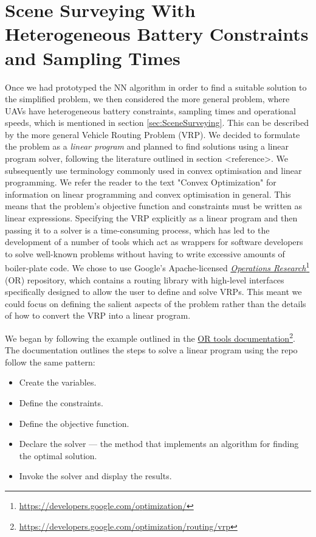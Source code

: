 \section{Scene Surveying With Heterogeneous Battery Constraints and Sampling Times}

Once we had prototyped the NN algorithm in order to find a suitable solution to the simplified problem, we then considered the more general problem, where UAVs have heterogeneous battery constraints, sampling times and operational speeds, which is mentioned in section \ref{sec:SceneSurveying}. This can be described by the more general Vehicle Routing Problem (VRP). We decided to formulate the problem as a \textit{linear program} and planned to find solutions using a linear program solver, following the literature outlined in section <reference>. We subsequently use terminology commonly used in convex optimisation and linear programming. We refer the reader to the text "Convex Optimization" \cite{Boyd2004ConvexOptimization} for information on linear programming and convex optimisation in general. This means that the problem's objective function and constraints must be written as linear expressions.
Specifying the VRP explicitly as a linear program and then passing it to a solver is a time-consuming process, which has led to the development of a number of tools which act as wrappers for software developers to solve well-known problems without having to write excessive amounts of boiler-plate code. We chose to use Google's Apache-licensed \href{https://developers.google.com/optimization/}{\textit{Operations Research}}\footnote{\href {https://developers.google.com/optimization/}{https://developers.google.com/optimization/}} (OR) repository, which contains a routing library with high-level interfaces specifically designed to allow the user to define and solve VRPs. This meant we could focus on defining the salient aspects of the problem rather than the details of how to convert the VRP into a linear program.

We began by following the example outlined in the \href{https://developers.google.com/optimization/routing/vrp}{OR tools documentation}\footnote{\href {https://developers.google.com/optimization/routing/vrp}{https://developers.google.com/optimization/routing/vrp}}. The documentation outlines the steps to solve a linear program using the repo follow the same pattern: 
\begin{itemize}
\item Create the variables.
\item Define the constraints.
\item Define the objective function.
\item Declare the solver — the method that implements an algorithm for finding the optimal solution.
\item Invoke the solver and display the results.
\end{itemize}

